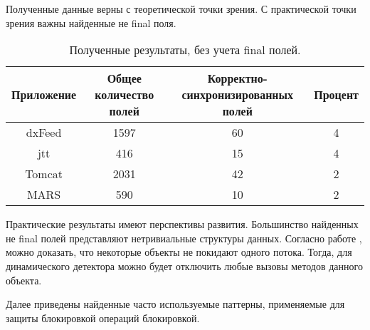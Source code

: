 Полученные данные верны с теоретической точки зрения. С практической точки зрения важны найденные не final поля. 

\begin{table}[H]
\label{results}
\begin{center}
\begin{tabular}{|c|c|c|c|}
\hline
Приложение & Общее количество полей & Корректно-синхронизированных полей & Процент \\
\hline
dxFeed & 1597 & 60 & 4 \\
\hline
jtt & 416 & 15 & 4 \\
\hline
Tomcat & 2031 & 42 & 2 \\
\hline
MARS & 590 & 10 & 2 \\
\hline

\end{tabular}
\captionsetup{justification=centering}
\caption{Полученные результаты, без учета final полей.}
\end{center}
\end{table}
Практические результаты имеют перспективы развития. Большинство найденных не final полей представляют нетривиальные структуры данных. Согласно работе \cite{Whaley:1999:CPE:320385.320400}, можно доказать, что некоторые объекты не покидают одного потока. Тогда, для динамического детектора можно будет отключить любые вызовы методов данного объекта.

Далее приведены найденные часто используемые паттерны, применяемые для защиты блокировкой операций блокировкой.




\FloatBarrier
